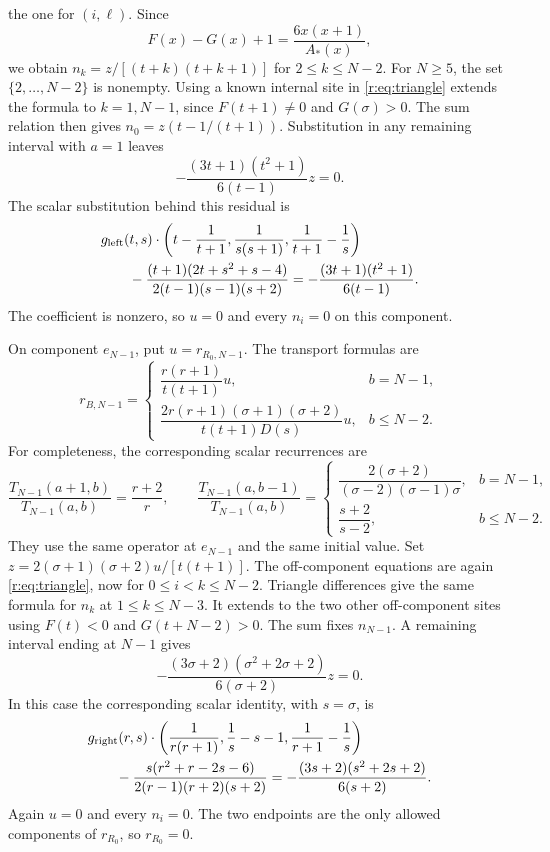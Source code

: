 \documentclass[11pt,a4paper]{article}
\numberwithin{equation}{section}
\theoremstyle{definition}\newtheorem{definition}[theorem]{Definition}
\theoremstyle{remark}\newtheorem{remark}[theorem]{Remark}
\begin{document}
the one for \((i,\ell)\). Since
\[
 F(x)-G(x)+1=\frac{6x(x+1)}{A_*(x)},
\]
we obtain \(n_k=z/[(t+k)(t+k+1)]\) for \(2\le k\le N-2\).
For \(N\ge5\), the set \(\{2,\ldots,N-2\}\) is nonempty.
Using a known internal site in \eqref{r:eq:triangle} extends the
formula to \(k=1,N-1\), since \(F(t+1)\ne0\) and
\(G(\sigma)>0\).
The sum relation then gives
\(n_0=z(t-1/(t+1))\). Substitution in any remaining interval
with \(a=1\) leaves
\[
                    -\frac{(3t+1)(t^2+1)}{6(t-1)}z=0.
\]
The scalar substitution behind this residual is
\begin{align*}
 &g_{\rm left}(t,s)\cdot
 \left(t-\frac1{t+1},\frac1{s(s+1)},\frac1{t+1}-\frac1s\right)\\
 &\qquad-\frac{(t+1)(2t+s^2+s-4)}{2(t-1)(s-1)(s+2)}
 =-\frac{(3t+1)(t^2+1)}{6(t-1)}.
\end{align*}
The coefficient is nonzero, so \(u=0\) and every \(n_i=0\)
on this component.

On component \(e_{N-1}\), put \(u=r_{R_0,N-1}\). The transport
formulas are
\[
 r_{B,N-1}=\begin{cases}
 \dfrac{r(r+1)}{t(t+1)}u,&b=N-1,\\[4pt]
 \dfrac{2r(r+1)(\sigma+1)(\sigma+2)}{t(t+1)D(s)}u,&b\le N-2.
 \end{cases}
\]
For completeness, the corresponding scalar recurrences are
\[
 \frac{T_{N-1}(a+1,b)}{T_{N-1}(a,b)}=\frac{r+2}{r},\qquad
 \frac{T_{N-1}(a,b-1)}{T_{N-1}(a,b)}=
 \begin{cases}
 \dfrac{2(\sigma+2)}{(\sigma-2)(\sigma-1)\sigma},&b=N-1,\\[3pt]
 \dfrac{s+2}{s-2},&b\le N-2.
 \end{cases}
\]
They use the same operator at $e_{N-1}$ and the same initial value.
Set \(z=2(\sigma+1)(\sigma+2)u/[t(t+1)]\).
The off-component equations are again \eqref{r:eq:triangle}, now
for \(0\le i<k\le N-2\). Triangle differences give the same
formula for \(n_k\) at \(1\le k\le N-3\). It extends to the
two other off-component sites using \(F(t)<0\) and
\(G(t+N-2)>0\). The sum fixes \(n_{N-1}\). A remaining interval
ending at \(N-1\) gives
\[
             -\frac{(3\sigma+2)(\sigma^2+2\sigma+2)}
                         {6(\sigma+2)}z=0.
\]
In this case the corresponding scalar identity, with $s=\sigma$, is
\begin{align*}
 &g_{\rm right}(r,s)\cdot
 \left(\frac1{r(r+1)},\frac1s-s-1,\frac1{r+1}-\frac1s\right)\\
 &\qquad-\frac{s(r^2+r-2s-6)}{2(r-1)(r+2)(s+2)}
 =-\frac{(3s+2)(s^2+2s+2)}{6(s+2)}.
\end{align*}
Again \(u=0\) and every \(n_i=0\). The two endpoints are the
only allowed components of \(r_{R_0}\), so \(r_{R_0}=0\).
\end{document}
